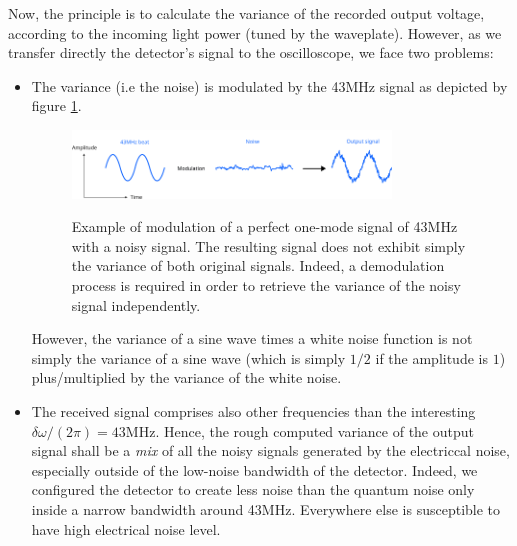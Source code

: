 \documentclass[11pt]{report}
\begin{document}
Now, the principle is to calculate the variance of the recorded output voltage, according to the incoming light power (tuned by the waveplate). However, as we transfer directly the detector's signal to the oscilloscope, we face two problems:
\begin{itemize}
	\item The variance (i.e the noise) is modulated by the 43MHz signal as depicted by figure \ref{fig:beatnoise}.
	
	\begin{figure}[h!]
	\caption{Example of modulation of a perfect one-mode signal of 43MHz with a noisy signal. The resulting signal does not exhibit simply the variance of both original signals. Indeed, a demodulation process is required in order to retrieve the variance of the noisy signal independently.}
	\centering
	\includegraphics[width=0.8\textwidth]{beatnoise}
	\label{fig:beatnoise}
	\end{figure}
	
	However, the variance of a sine wave times a white noise function is not simply the variance of a sine wave (which is simply $1/2$ if the amplitude is $1$) plus/multiplied by the variance of the white noise.
	\item The received signal comprises also other frequencies than the interesting $\delta\omega/(2\pi) = 43$MHz. Hence, the rough computed variance of the output signal shall be a \textit{mix} of all the noisy signals generated by the electriccal noise, especially outside of the low-noise bandwidth of the detector. Indeed, we configured the detector to create less noise than the quantum noise only inside a narrow bandwidth around 43MHz. Everywhere else is susceptible to have high electrical noise level.
\end{itemize}
\end{document}
